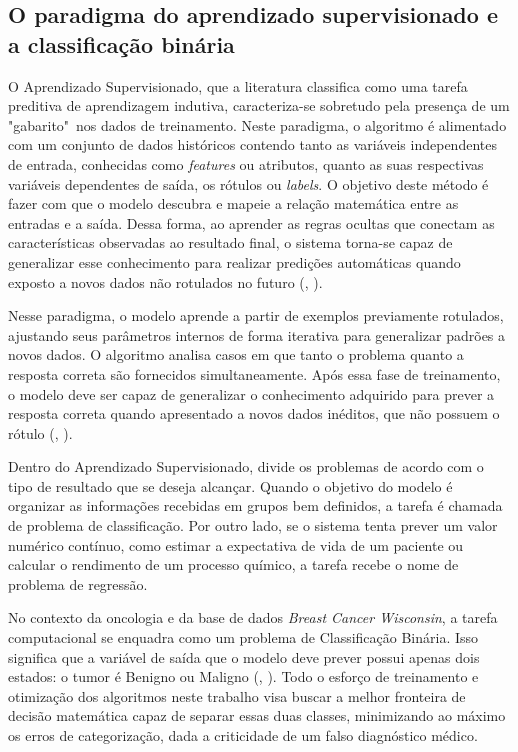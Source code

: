 \documentclass[
    12pt
    ,oneside
    ,a4paper
    ,chapter=TITLE
    ,section=TITLE
    ,sumario=abnt-6027-2012
    ,english,brazil]{abntex2} %
\begin{document}
\subsection{O paradigma do aprendizado supervisionado e a classificação binária}


O Aprendizado Supervisionado, que a literatura classifica como uma tarefa preditiva de aprendizagem indutiva, caracteriza-se sobretudo pela presença de um "gabarito"\ nos dados de treinamento. Neste paradigma, o algoritmo é alimentado com um conjunto de dados históricos contendo tanto as variáveis independentes de entrada, conhecidas como \textit{features} ou atributos, quanto as suas respectivas variáveis dependentes de saída, os rótulos ou \textit{labels}. O objetivo deste método é fazer com que o modelo descubra e mapeie a relação matemática entre as entradas e a saída. Dessa forma, ao aprender as regras ocultas que conectam as características observadas ao resultado final, o sistema torna-se capaz de generalizar esse conhecimento para realizar predições automáticas quando exposto a novos dados não rotulados no futuro (, \citeyear{Faceli2011}).

Nesse paradigma, o modelo aprende a partir de exemplos previamente rotulados, ajustando seus parâmetros internos de forma iterativa para generalizar padrões a novos dados. O algoritmo analisa casos em que tanto o problema quanto a resposta correta são fornecidos simultaneamente. Após essa fase de treinamento, o modelo deve ser capaz de generalizar o conhecimento adquirido para prever a resposta correta quando apresentado a novos dados inéditos, que não possuem o rótulo (, \citeyear{Faceli2011}). 

Dentro do Aprendizado Supervisionado,  divide os problemas de acordo com o tipo de resultado que se deseja alcançar. Quando o objetivo do modelo é organizar as informações recebidas em grupos bem definidos, a tarefa é chamada de problema de classificação. Por outro lado, se o sistema tenta prever um valor numérico contínuo, como estimar a expectativa de vida de um paciente ou calcular o rendimento de um processo químico, a tarefa recebe o nome de problema de regressão.

No contexto da oncologia e da base de dados \textit{Breast Cancer Wisconsin}, a tarefa computacional se enquadra como um problema de Classificação Binária. Isso significa que a variável de saída que o modelo deve prever possui apenas dois estados: o tumor é Benigno ou Maligno (, \citeyear{Street1993}). Todo o esforço de treinamento e otimização dos algoritmos neste trabalho visa buscar a melhor fronteira de decisão matemática capaz de separar essas duas classes, minimizando ao máximo os erros de categorização, dada a criticidade de um falso diagnóstico médico.
\end{document}
